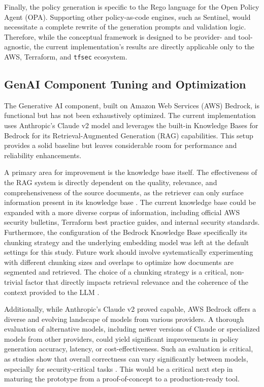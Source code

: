 Finally, the policy generation is specific to the Rego language for the Open Policy Agent (OPA). Supporting other policy-as-code engines, such as Sentinel, would necessitate a complete rewrite of the generation prompts and validation logic. Therefore, while the conceptual framework is designed to be provider- and tool-agnostic, the current implementation's results are directly applicable only to the AWS, Terraform, and \texttt{tfsec} ecosystem.

\subsection{GenAI Component Tuning and Optimization}
The Generative AI component, built on Amazon Web Services (AWS) Bedrock, is functional but has not been exhaustively optimized. The current implementation uses Anthropic's Claude v2 model and leverages the built-in Knowledge Bases for Bedrock for its Retrieval-Augmented Generation (RAG) capabilities. This setup provides a solid baseline but leaves considerable room for performance and reliability enhancements.

A primary area for improvement is the knowledge base itself. The effectiveness of the RAG system is directly dependent on the quality, relevance, and comprehensiveness of the source documents, as the retriever can only surface information present in its knowledge base \cite{lewis_retrieval-augmented_2021}. The current knowledge base could be expanded with a more diverse corpus of information, including official AWS security bulletins, Terraform best practice guides, and internal security standards. Furthermore, the configuration of the Bedrock Knowledge Base specifically its chunking strategy and the underlying embedding model was left at the default settings for this study. Future work should involve systematically experimenting with different chunking sizes and overlaps to optimize how documents are segmented and retrieved. The choice of a chunking strategy is a critical, non-trivial factor that directly impacts retrieval relevance and the coherence of the context provided to the LLM \cite{gao_retrieval-augmented_2024}.

Additionally, while Anthropic's Claude v2 proved capable, AWS Bedrock offers a diverse and evolving landscape of models from various providers. A thorough evaluation of alternative models, including newer versions of Claude or specialized models from other providers, could yield significant improvements in policy generation accuracy, latency, or cost-effectiveness. Such an evaluation is critical, as studies show that overall correctness can vary significantly between models, especially for security-critical tasks \cite{pearce_deployability-centric_2025}. This would be a critical next step in maturing the prototype from a proof-of-concept to a production-ready tool.

